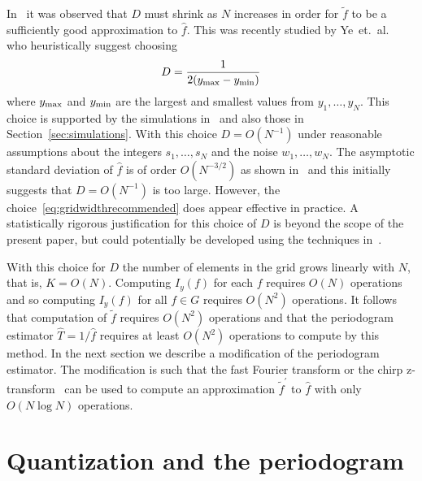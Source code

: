 \documentclass[10pt,twocolumn,twoside]{IEEEtran}
\begin{document}
In~\cite{McKilliam2007} it was observed that $D$ must shrink as $N$ increases in order for $\widetilde{f}$ to be a sufficiently good approximation to $\hat{f}$.  This was recently studied by Ye~et.~al.~\cite{Haohuan2013435,6492742} who heuristically suggest choosing
\begin{equation}\label{eq:gridwidthrecommended}
D = \frac{1}{2(y_{\text{max}} - y_{\text{min}})}
\end{equation}
where $y_{\text{max}}$ and $y_{\text{min}}$ are the largest and smallest values from $y_1,\dots,y_N$.  This choice is supported by the simulations in~\cite{Haohuan2013435,6492742} and also those in Section~\ref{sec:simulations}.  With this choice $D = O(N^{-1})$ under reasonable assumptions about the integers $s_1,\dots,s_N$ and the noise $w_1,\dots,w_N$.  The asymptotic standard deviation of $\hat{f}$ is of order $O(N^{-3/2})$ as shown in~\cite{Quinn20013asilomar_period_est} and this initially suggests that $D = O(N^{-1})$ is too large.  However, the choice~\eqref{eq:gridwidthrecommended} does appear effective in practice.  A statistically rigorous justification for this choice of $D$ is beyond the scope of the present paper, but could potentially be developed using the techniques in~\cite{Quinn2008maximizing_the_periodogram}.

With this choice for $D$ the number of elements in the grid grows linearly with $N$, that is, $K = O(N)$.  Computing $I_y(f)$ for each $f$ requires $O(N)$ operations and so computing $I_y(f)$ for all $f \in G$ requires $O(N^2)$ operations.  It follows that computation of $\widetilde{f}$ requires $O(N^2)$ operations and that the periodogram estimator $\hat{T} = 1/\hat{f}$ requires at least $O(N^2)$ operations to compute by this method.  %
In the next section we describe a modification of the periodogram estimator.  The modification is such that the fast Fourier transform or the chirp z-transform~\cite{Rabiner1969} can be used to compute an approximation $\widetilde{f}^\prime$ to $\hat{f}$ with only $O(N\log N)$ operations.

\section{Quantization and the periodogram}\label{sec:quant-peri} 
\end{document}
